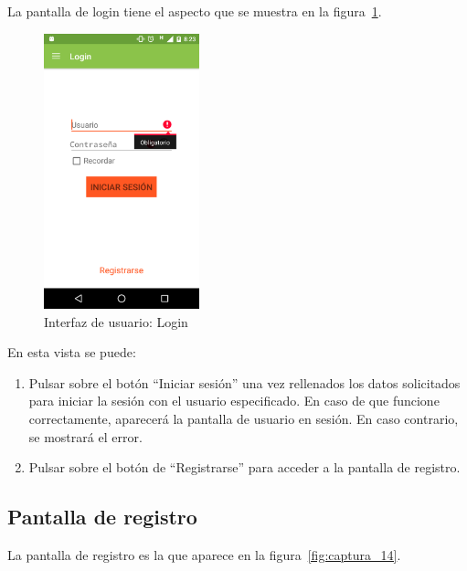 La pantalla de login tiene el aspecto que se muestra en la
figura~\ref{fig:captura_13}.

\begin{figure}[htbp]
  \centering
  \includegraphics[width=0.4\textwidth]{cap5/img/captura_13}
  \caption{Interfaz de usuario: Login}
  \label{fig:captura_13}
\end{figure}

En esta vista se puede:
\begin{enumerate}
\item Pulsar sobre el botón ``Iniciar sesión'' una vez
  rellenados los datos solicitados para iniciar la sesión con el usuario
  especificado. En caso de que funcione correctamente, aparecerá la pantalla de
  usuario en sesión. En caso contrario, se mostrará el error.
\item Pulsar sobre el botón de ``Registrarse'' para acceder a la pantalla de
  registro.
\end{enumerate}

\subsection{Pantalla de registro}

La pantalla de registro es la que aparece en la figura~\ref{fig:captura_14}.

